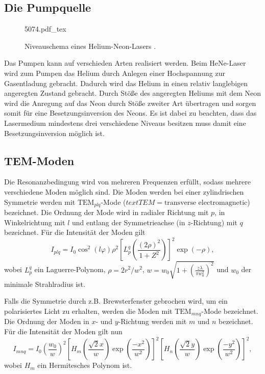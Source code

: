 \subsection{Die Pumpquelle}
\begin{figure}
	\centering
	\def\svgwidth{0.5\linewidth}
	{5074.pdf_tex}
	\caption{Niveauschema eines Helium-Neon-Lasers \cite{VHeNeGoettingen}.}
\end{figure}
Das Pumpen kann auf verschieden Arten realisiert werden. Beim HeNe-Laser wird zum Pumpen das Helium durch Anlegen einer Hochspannung zur Gasentladung gebracht. Dadurch wird das Helium in einen relativ langlebigen angeregten Zustand gebracht. Durch Stöße des angeregten Heliums mit dem Neon wird die Anregung auf das Neon durch Stöße zweiter Art übertragen und sorgen somit für eine Besetzungsinversion des Neons. Es ist dabei zu beachten, dass das Lasermedium mindestens drei verschiedene Niveaus besitzen muss damit eine Besetzungsinversion möglich ist.


\subsection{TEM-Moden}
Die Resonanzbedingung wird von mehreren Frequenzen erfüllt, sodass mehrere verschiedene Moden möglich sind. Die Moden werden bei einer zylindrischen Symmetrie werden mit $\text{TEM}_{plq}$-Mode ($text{TEM}=\text{transverse electromagnetic}$) bezeichnet. Die Ordnung der Mode wird in radialer Richtung mit $p$, in Winkelrichtung mit $l$ und entlang der Symmetrieachse (in $z$-Richtung) mit $q$ bezeichnet. Für die Intensität der Moden gilt
\begin{equation}
	I_{plq} = I_0 \cos^2 (l \varphi) \rho^2 \left[L_{p}^q\left(\frac{(2 \rho)^2}{1+Z^2} \right)\right] ^2 \exp\left(-\rho \right),
\end{equation}
wobei $L_{p}^q$ ein Laguerre-Polynom, $\rho=2 r^2 / w^2$, $w=w_0 \sqrt{1+\left(\frac{z \lambda}{\pi w_0^2}\right)^2}$ und $w_0$ der minimale Strahlradius ist.

Falls die Symmetrie durch z.B. Brewsterfenster gebrochen wird, um ein polarisiertes Licht zu erhalten, werden die Moden mit  $\text{TEM}_{mnq}$-Mode bezeichnet. Die Ordnung der Moden in $x$- und $y$-Richtung werden mit $m$ und $n$ bezeichnet. Für die Intensität der Moden gilt nun
\begin{equation}
I_{mnq} = I_0 \left(\frac{w_0}{w}\right)^2 \left[H_m\left(\frac{\sqrt{2} x}{w}\right) \exp\left(\frac{-x^2}{w^2}\right) \right]^2 \left[H_n\left(\frac{\sqrt{2} y}{w}\right) \exp\left(\frac{-y^2}{w^2}\right) \right]^2, \label{eq:tem}
\end{equation}
wobei $H_m$ ein Hermitesches Polynom ist.


